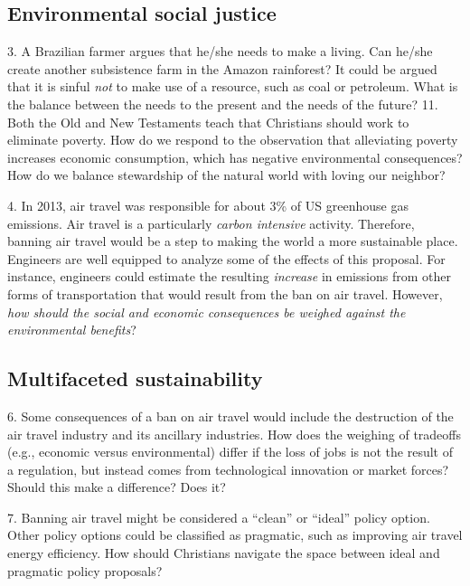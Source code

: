 \documentclass[12pt]{article}
\begin{document}
\subsection{Environmental social justice}
3. A Brazilian farmer argues that he/she needs to make a living. Can he/she create another subsistence farm in the Amazon rainforest?  
It could be argued that it is sinful \emph{not} to make use of a resource, such as coal or petroleum. What is the balance between
the needs to the present and the needs of the future?		
11. Both the Old and New Testaments teach that Christians should work to eliminate poverty. How do we respond to the 
observation that alleviating poverty increases economic consumption, which has negative environmental consequences?
How do we balance stewardship of the natural world with loving our neighbor?


4. In 2013, air travel was responsible for about 3\% of US greenhouse gas emissions. %
Air travel is a particularly \emph{carbon intensive} activity. Therefore, banning air travel would be a step to making the 
world a more sustainable place. Engineers are well equipped to analyze some of the effects of this proposal. For instance,
engineers could estimate the resulting \emph{increase} in emissions from other forms of transportation that would result from 
the ban on air travel. However, \emph{how should the social and economic consequences be weighed against the environmental 
benefits}? 


\subsection{Multifaceted sustainability}


6. Some consequences of a ban on air travel would include the destruction of the air travel industry and its ancillary
industries. How does the weighing of tradeoffs (e.g., economic versus environmental) differ if the loss of jobs is not
the result of a regulation, but instead comes from technological innovation or market forces? Should this make a
difference? Does it?

7. Banning air travel might be considered a ``clean'' or ``ideal'' policy option. Other policy options could be classified
as pragmatic, such as improving air travel energy efficiency. How should Christians navigate the space between ideal and
pragmatic policy proposals?
\end{document}
